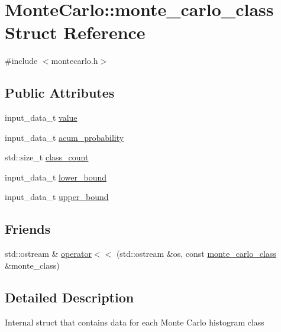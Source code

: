 \hypertarget{structMonteCarlo_1_1monte__carlo__class}{}\section{Monte\+Carlo\+:\+:monte\+\_\+carlo\+\_\+class Struct Reference}
\label{structMonteCarlo_1_1monte__carlo__class}


{\ttfamily \#include $<$montecarlo.\+h$>$}

\subsection*{Public Attributes}
\begin{DoxyCompactItemize}
\item 
input\+\_\+data\+\_\+t \hyperlink{structMonteCarlo_1_1monte__carlo__class_ab836eb958a7396f9d12b3d15683527e5}{value}
\item 
input\+\_\+data\+\_\+t \hyperlink{structMonteCarlo_1_1monte__carlo__class_aa18ef8c3608fb1816dad7ea914f85634}{acum\+\_\+probability}
\item 
std\+::size\+\_\+t \hyperlink{structMonteCarlo_1_1monte__carlo__class_aeb1efb33c2cd66ae700593af43ab9339}{class\+\_\+count}
\item 
input\+\_\+data\+\_\+t \hyperlink{structMonteCarlo_1_1monte__carlo__class_aa69f181a68ef123a72d4b16763e2d465}{lower\+\_\+bound}
\item 
input\+\_\+data\+\_\+t \hyperlink{structMonteCarlo_1_1monte__carlo__class_a58ec0e102087f3fe38fbbe7d6b60f4d9}{upper\+\_\+bound}
\end{DoxyCompactItemize}
\subsection*{Friends}
\begin{DoxyCompactItemize}
\item 
std\+::ostream \& \hyperlink{structMonteCarlo_1_1monte__carlo__class_a24eb0421cd0a0c30fa7b97ca39b4bf09}{operator$<$$<$} (std\+::ostream \&os, const \hyperlink{structMonteCarlo_1_1monte__carlo__class}{monte\+\_\+carlo\+\_\+class} \&monte\+\_\+class)
\end{DoxyCompactItemize}


\subsection{Detailed Description}
Internal struct that contains data for each Monte Carlo histogram class 

